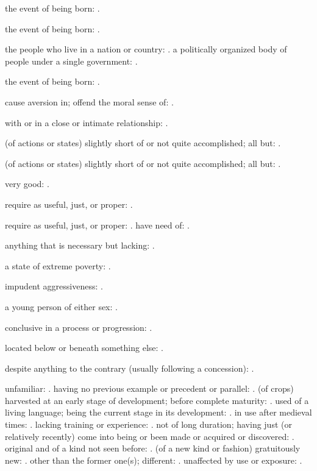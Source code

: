   the event of being born: .

  the event of being born: .

  the people who live in a nation or country: . a politically organized body of people under a single government: .

  the event of being born: .

  cause aversion in; offend the moral sense of: .

  with or in a close or intimate relationship: .

  (of actions or states) slightly short of or not quite accomplished; all but: .

  (of actions or states) slightly short of or not quite accomplished; all but: .

  very good: .

  require as useful, just, or proper: .

  require as useful, just, or proper: . have need of: .

  anything that is necessary but lacking: .

  a state of extreme poverty: .

  impudent aggressiveness: .

  a young person of either sex: .

  conclusive in a process or progression: .

  located below or beneath something else: .

  despite anything to the contrary (usually following a concession): .

  unfamiliar: . having no previous example or precedent or parallel: . (of crops) harvested at an early stage of development; before complete maturity: . used of a living language; being the current stage in its development: . in use after medieval times: . lacking training or experience: . not of long duration; having just (or relatively recently) come into being or been made or acquired or discovered: . original and of a kind not seen before: . (of a new kind or fashion) gratuitously new: . other than the former one(s); different: . unaffected by use or exposure: .


